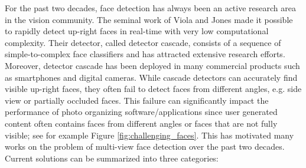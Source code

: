 \documentclass{sig-alternate-2013}
\begin{document}
For the past two decades, face detection has always been an active research area in the vision community. The seminal work of Viola and Jones \cite{VJ} made it possible to rapidly detect up-right faces in real-time with very low computational complexity. Their detector, called detector cascade, consists of a sequence of simple-to-complex face classifiers and has attracted extensive research efforts. Moreover, detector cascade has been deployed in many commercial products such as smartphones and digital cameras. 
While cascade detectors can accurately find visible up-right faces, they often fail to detect faces from different angles, e.g. side view or partially occluded faces. This failure can significantly impact the performance of photo organizing software/applications  since user generated content often contains faces from different angles or faces that are not fully visible; see for example Figure \ref{fig:challenging_faces}. This has motivated many works on the problem of multi-view face detection over the past two decades. Current solutions can be summarized into three categories: 
\end{document}
